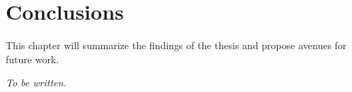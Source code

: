\chapter{Conclusions}
\label{ch:conclusions}

This chapter will summarize the findings of the thesis and propose avenues for future work.

\textit{To be written.}
